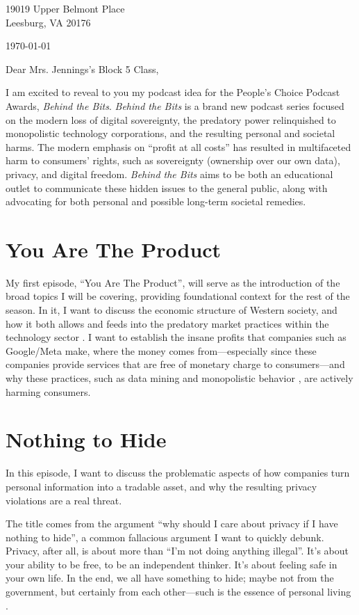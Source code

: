 \documentclass[12pt]{article}
\newcommand{\name}{\emph{Behind the Bits}}
\begin{document}
\begin{flushright}
  19019 Upper Belmont Place \\ Leesburg, VA 20176
  
  \medskip \today
\end{flushright}

\medskip
Dear Mrs. Jennings’s Block 5 Class,

\medskip I am excited to reveal to you my podcast idea for the People’s Choice
Podcast Awards, \name. \name{} is a brand new podcast series focused on the
modern loss of digital sovereignty, the predatory power relinquished to
monopolistic technology corporations, and the resulting personal and societal
harms. The modern emphasis on ``profit at all costs'' has resulted in
multifaceted harm to consumers’ rights, such as sovereignty (ownership over our
own data), privacy, and digital freedom. \name{} aims to be both an educational
outlet to communicate these hidden issues to the general public, along with
advocating for both personal and possible long-term societal remedies.

\section{You Are The Product}
My first episode, ``You Are The Product'', will serve as the introduction of the
broad topics I will be covering, providing foundational context for the rest of
the season. In it, I want to discuss the economic structure of Western society,
and how it both allows and feeds into the predatory market practices within the
technology sector \autocite{Elvy2017:PayingForPrivacyAndThePersonalDataEconomy}.
I want to establish the insane profits that companies such as Google/Meta make, where the money comes from---especially since these companies provide services
that are free of monetary charge to consumers---and why these practices, such as
data mining and monopolistic behavior \autocite{GodoyShepardson2024:GooglesUs}, are actively harming consumers.

\section{Nothing to Hide}
In this episode, I want to discuss the problematic aspects of how companies turn
personal information into a tradable asset, and why the resulting privacy
violations are a real threat.

The title comes from the argument ``why should I care about privacy if I have
nothing to hide'', a common fallacious argument I want to quickly debunk.
Privacy, after all, is about more than ``I'm not doing anything illegal''. It's
about your ability to be free, to be an independent thinker. It's about feeling
safe in your own life. In the end, we all have something to hide; maybe not from
the government, but certainly from each other---such is the essence of personal
living \autocite{Mordini2008:NothingHideBiometricPrivacyPrivateSphere}.
\end{document}
